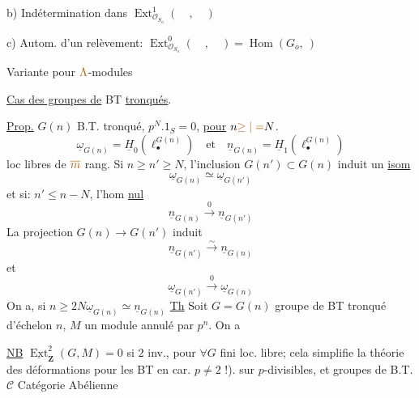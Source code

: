b) Indétermination dans $\operatorname{Ext}^1_{\mathcal O_{S_o}}(\quad,\quad)$

c) Autom. d'un relèvement: $\operatorname{Ext}^0_{\mathcal O_{S_o}}(\quad,\quad)=\operatorname{Hom}(G_o,\ )$

Variante pour $\unsure{\Lambda}$-modules

\uline{Cas des groupes de} BT \uline{tronqués}.

\uline{Prop.} $G(n)$ B.T. tronqué, $p^N.1_S=0$, \uline{pour} $n\unsure{\geq|=}N$.
\[
\underline\omega_{G(n)}=\underline H_0(\ell_\bullet^{G(n)})\quad\text{et}\quad\underline n_{G(n)}=\underline H_1(\ell_\bullet^{G(n)})
\]
loc libres de $\unsure{\overline m}$ rang. Si $n\geq n'\geq N$, l'inclusion $G(n')\subset G(n)$ \deleted{$\unsure{\simeq}$} induit un \uline{isom}
\[
\underline\omega_{G(n)}\simeq\underline\omega_{G(n')}
\]
et si: $n'\leq n-N$, l'hom \uline{nul}
\[
\underline n_{G(n)}\xrightarrow{0}\underline n_{G(n')}
\]
La projection $G(n)\longrightarrow G(n')$ induit
\[
\underline n_{G(n')}\xrightarrow{\sim}\underline n_{G(n)}
\]
et
\[
\underline\omega_{G(n')}\xrightarrow{0}\underline\omega_{G(n)}
\]
On a, si $n\geq2N$\qquad$\underline\omega_{G(n)}\simeq\underline n_{G(n)}$
\uline{Th} Soit $G=G(n)$ groupe de BT tronqué d'échelon $n$, $M$ un module  annulé par $p^n$.
On a

\uline{NB} $\underline{\operatorname{Ext}}^2_{\mathbf Z}(G,M)=0$ si $2$ inv., pour $\forall G$ fini loc. libre; cela simplifie la théorie des déformations pour les BT en car. $p\ne2$ !).
 sur  $p$-divisibles,
et groupes de B.T.
$\mathcal C$ Catégorie Abélienne


